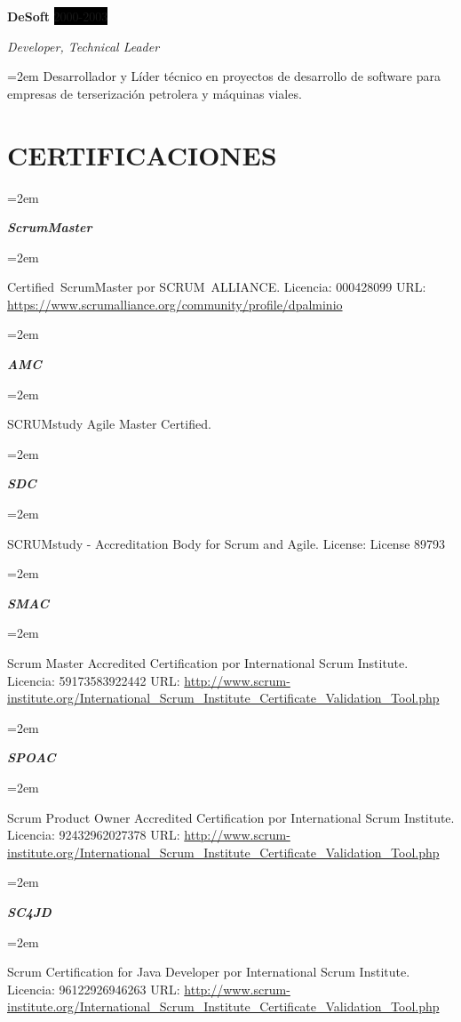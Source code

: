 \documentclass[paper=a4,fontsize=11pt]{scrartcl} %
\newlength{\spacebox}
\newcommand{\sepspace}{\vspace*{1em}}		%
\newcommand{\NewPart}[1]{\section*{\uppercase{#1}}}
\newcommand{\CertificatesEntry}[2]{      %
		\noindent\hangindent=2em\hangafter=0 %
		\parbox{\spacebox}{        %
		\textit{#1}}			   %
		\hspace{1.5em} #2 \par}    %
\newcommand{\EducationEntry}[4]{
		\noindent \textbf{#1} \hfill      %
		\colorbox{Black}{%
			\parbox{6em}{%
			\hfill\color{White}#2}} \par  %
		\noindent \textit{#3} \par        %
		\noindent\hangindent=2em\hangafter=0 \small #4 %
		\normalsize \par}
\newcommand{\WorkEntry}[4]{				  %
		\noindent \textbf{#1} \hfill      %
		\colorbox{Black}{\color{White}#2} \par  %
		\noindent \textit{#3} \par              %
		\noindent\hangindent=2em\hangafter=0 \small #4 %
		\normalsize \par}
\begin{document}
\sepspace

\WorkEntry{DeSoft}{2000-2003}{Developer, Technical Leader}{
Desarrollador y Líder técnico en proyectos de desarrollo de software para empresas de terserización petrolera y máquinas viales.}

\sepspace

\NewPart{Certificaciones}{}

\CertificatesEntry{\large{\textbf{ScrumMaster}}}{}
\CertificatesEntry{}{
Certified ScrumMaster por SCRUM ALLIANCE.\newline
Licencia: 000428099\newline
URL: \url{https://www.scrumalliance.org/community/profile/dpalminio}
}
\sepspace

\CertificatesEntry{\large{\textbf{AMC}}}{}
\CertificatesEntry{}{
SCRUMstudy Agile Master Certified.\newline
}
\sepspace

\CertificatesEntry{\large{\textbf{SDC}}}{}
\CertificatesEntry{}{
SCRUMstudy - Accreditation Body for Scrum and Agile.\newline
License: License 89793\newline
}
\sepspace

\CertificatesEntry{\large{\textbf{SMAC}}}{}
\CertificatesEntry{}{
Scrum Master Accredited Certification por International Scrum Institute.\newline
Licencia: 59173583922442\newline
URL: \url{http://www.scrum-institute.org/International_Scrum_Institute_Certificate_Validation_Tool.php}
}
\sepspace

\CertificatesEntry{\large{\textbf{SPOAC}}}{}
\CertificatesEntry{}{
Scrum Product Owner Accredited Certification por International Scrum Institute.\newline
Licencia: 92432962027378\newline
URL: \url{http://www.scrum-institute.org/International_Scrum_Institute_Certificate_Validation_Tool.php}
}
\sepspace

\CertificatesEntry{\large{\textbf{SC4JD}}}{}
\CertificatesEntry{}{
Scrum Certification for Java Developer por International Scrum Institute.\newline
Licencia: 96122926946263\newline
URL: \url{http://www.scrum-institute.org/International_Scrum_Institute_Certificate_Validation_Tool.php}
}
\sepspace
\end{document}
